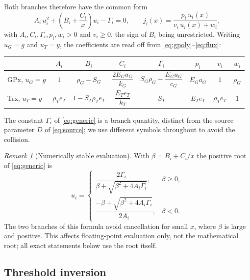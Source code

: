 \documentclass[11pt,a4paper]{article}
\theoremstyle{plain}
\theoremstyle{definition}
\theoremstyle{remark}
\newtheorem{remark}[theorem]{Remark}
\newcommand{\Gm}{\Gamma}
\begin{document}
Both branches therefore have the common form
\begin{equation}\label{eq:generic}
  A_i\,u_i^2+\left(B_i+\frac{C_i}{x}\right)u_i-\Gm_i=0,
  \qquad j_i(x)=\frac{p_i\,u_i(x)}{v_i\,u_i(x)+w_i},
\end{equation}
with $A_i,C_i,\Gm_i,p_i,w_i>0$ and $v_i\ge0$, the sign of $B_i$ being
unrestricted. Writing $u_G=g$ and $u_T=y$, the coefficients are read off from
\eqref{eq:gpoly}--\eqref{eq:flux}:

\medskip
\begin{center}\small
\begin{tabular}{lccccccc}
\toprule
 & $A_i$ & $B_i$ & $C_i$ & $\Gm_i$ & $p_i$ & $v_i$ & $w_i$\\
\midrule
GPx, $u_G=g$ & $1$ & $\rho_G-S_G$ & $\dfrac{2E_Ga_G}{k_G}$
  & $S_G\rho_G-\dfrac{E_Ga_G}{c_G}$ & $E_Ga_G$ & $1$ & $\rho_G$\\[10pt]
Trx, $u_T=y$ & $\rho_Te_T$ & $1-S_T\rho_Te_T$ & $\dfrac{E_Te_T}{k_T}$
  & $S_T$ & $E_Te_T$ & $\rho_Te_T$ & $1$\\
\bottomrule
\end{tabular}
\end{center}
\medskip

\noindent
The constant $\Gm_i$ of \eqref{eq:generic} is a branch quantity, distinct from the
source parameter $D$ of \eqref{eq:source}; we use different symbols throughout to
avoid the collision.

\begin{remark}[Numerically stable evaluation]\label{rem:stable}
With $\beta=B_i+C_i/x$ the positive root of \eqref{eq:generic} is
\[
  u_i=\begin{cases}
    \dfrac{2\Gm_i}{\beta+\sqrt{\beta^2+4A_i\Gm_i}}, & \beta\ge0,\\[10pt]
    \dfrac{-\beta+\sqrt{\beta^2+4A_i\Gm_i}}{2A_i}, & \beta<0 .
  \end{cases}
\]
The two branches of this formula avoid cancellation for small $x$, where $\beta$ is
large and positive. This affects floating-point evaluation only, not the
mathematical root; all exact statements below use the root itself.
\end{remark}

\subsection{Threshold inversion}
\end{document}
